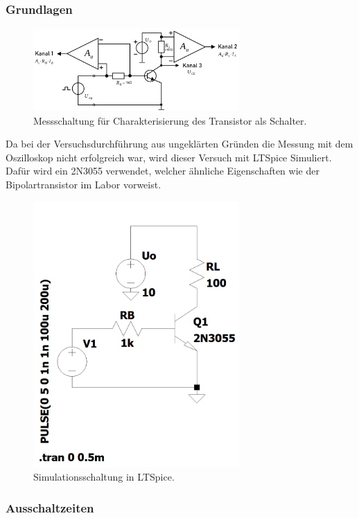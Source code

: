 \documentclass[
	a4paper, %
	12pt, %
]{CSUniSchoolLabReport}
\begin{document}
\subsubsection{Grundlagen}
\begin{figure}[H]
	\centering
	\includegraphics[width=0.7\textwidth]{Figures/MessschaltungSchaltanwendung.png}
	\caption{Messschaltung für Charakterisierung des Transistor als Schalter.}
	\label{fig:MessschaltungSchaltanwendung}
\end{figure}
Da bei der Versuchsdurchführung aus ungeklärten Gründen die Messung mit dem Oszilloskop nicht erfolgreich war, wird dieser Versuch mit LTSpice Simuliert. Dafür wird ein 2N3055 verwendet, welcher ähnliche Eigenschaften wie der Bipolartransistor im Labor vorweist.  
\begin{figure}[H]
	\centering
	\includegraphics[width=0.7\textwidth]{Figures/LTSpiceSchaltung.png}
	\caption{Simulationsschaltung in LTSpice.}
	\label{fig:LTSpiceSchaltung}
\end{figure}
\subsubsection{Ausschaltzeiten}
\end{document}
